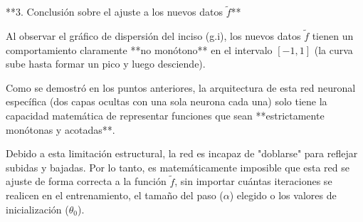 \documentclass{article}
\begin{document}
\begin{enumerate}[label=\roman*., widest=ii]
**3. Conclusión sobre el ajuste a los nuevos datos $\tilde{f}$**

Al observar el gráfico de dispersión del inciso (g.i), los nuevos datos $\tilde{f}$ tienen un comportamiento claramente **no monótono** en el intervalo $[-1, 1]$ (la curva sube hasta formar un pico y luego desciende). 

Como se demostró en los puntos anteriores, la arquitectura de esta red neuronal específica (dos capas ocultas con una sola neurona cada una) solo tiene la capacidad matemática de representar funciones que sean **estrictamente monótonas y acotadas**. 

Debido a esta limitación estructural, la red es incapaz de "doblarse" para reflejar subidas y bajadas. Por lo tanto, es matemáticamente imposible que esta red se ajuste de forma correcta a la función $\tilde{f}$, sin importar cuántas iteraciones se realicen en el entrenamiento, el tamaño del paso ($\alpha$) elegido o los valores de inicialización ($\theta_0$).
\end{enumerate}
\end{document}
